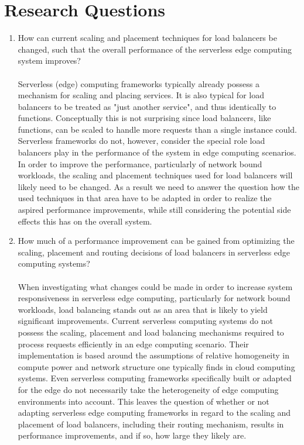 \section{Research Questions}

\begin{enumerate}
        \item How can current scaling and placement techniques for load balancers be changed, such that the overall performance of the serverless edge computing system improves?\\\\
    Serverless (edge) computing frameworks typically already possess a mechanism for scaling and placing services. It is also typical for load balancers to be treated as "just another service", and thus identically to functions\cite{openfaas}.
    Conceptually this is not surprising since load balancers, like functions, can be scaled to handle more requests than a single instance could.
    Serverless frameworks do not, however, consider the special role load balancers play in the performance of the system in edge computing scenarios.
    In order to improve the performance, particularly of network bound workloads, the scaling and placement techniques used for load balancers will likely need to be changed. As a result we need to answer the question how the used techniques in that area have to be adapted in order to realize the aspired performance improvements, while still considering the potential side effects this has on the overall system.

        \item How much of a performance improvement can be gained from optimizing the scaling, placement and routing decisions of load balancers in serverless edge computing systems?\\\\
    When investigating what changes could be made in order to increase system responsiveness in serverless edge computing, particularly for network bound workloads, load balancing stands out as an area that is likely to yield significant improvements. Current serverless computing systems do not possess the scaling, placement and load balancing mechanisms required to process requests efficiently in an edge computing scenario. Their implementation is based around the assumptions of relative homogeneity in compute power and network structure one typically finds in cloud computing systems. Even serverless computing frameworks specifically built or adapted for the edge do not necessarily take the heterogeneity of edge computing environments into account. %
    This leaves the question of whether or not adapting serverless edge computing frameworks in regard to the scaling and placement of load balancers, including their routing mechanism, results in performance improvements, and if so, how large they likely are.
    

\end{enumerate}
